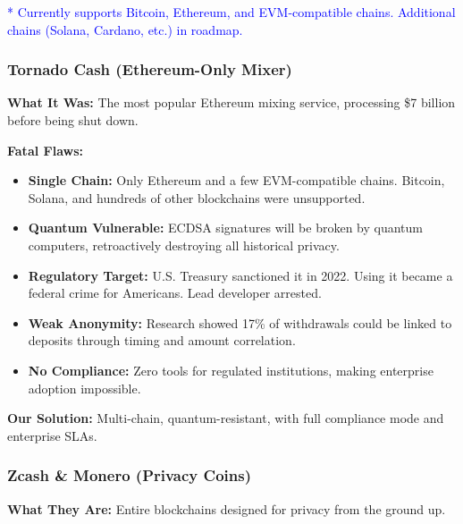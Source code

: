 \documentclass[11pt,a4paper]{article}
\begin{document}
\textcolor{blue}{* Currently supports Bitcoin, Ethereum, and EVM-compatible chains. Additional chains (Solana, Cardano, etc.) in roadmap.}

\subsubsection{Tornado Cash (Ethereum-Only Mixer)}

\textbf{What It Was:} The most popular Ethereum mixing service, processing \$7 billion before being shut down.

\textbf{Fatal Flaws:}
\begin{itemize}
    \item \textbf{Single Chain:} Only Ethereum and a few EVM-compatible chains. Bitcoin, Solana, and hundreds of other blockchains were unsupported.

    \item \textbf{Quantum Vulnerable:} ECDSA signatures will be broken by quantum computers, retroactively destroying all historical privacy.

    \item \textbf{Regulatory Target:} U.S. Treasury sanctioned it in 2022. Using it became a federal crime for Americans. Lead developer arrested.

    \item \textbf{Weak Anonymity:} Research showed 17\% of withdrawals could be linked to deposits through timing and amount correlation.

    \item \textbf{No Compliance:} Zero tools for regulated institutions, making enterprise adoption impossible.
\end{itemize}

\textbf{Our Solution:} Multi-chain, quantum-resistant, with full compliance mode and enterprise SLAs.

\subsubsection{Zcash \& Monero (Privacy Coins)}

\textbf{What They Are:} Entire blockchains designed for privacy from the ground up.
\end{document}
